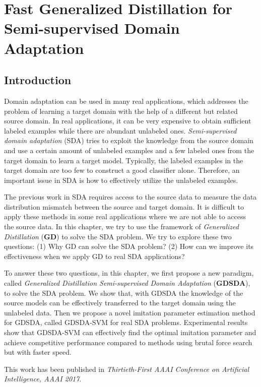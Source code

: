 \chapter{Fast Generalized Distillation for Semi-supervised Domain Adaptation}\label{sec:aaai}
\section{Introduction}
Domain adaptation can be used in many real applications, which addresses the problem of learning a target domain with the help of a different but related source domain. 
In real applications, it can be very expensive to obtain sufficient labeled examples while there are abundant unlabeled ones. 
\textit{Semi-supervised domain adaptation} (SDA) tries to exploit the knowledge from the source domain and use a certain amount of unlabeled examples and a few labeled ones from the target domain to learn a target model. Typically, the labeled examples in the target domain are too few to construct a good classifier alone. Therefore, an important issue in SDA is how to effectively utilize the unlabeled examples.

The previous work in SDA requires access to the source data to measure the data distribution mismatch between the source and target domain\cite{duan2009domain,Donahue_2013_CVPR,daume2010frustratingly,yao2015semi}. It is difficult to apply these methods in some real applications where we are not able to access the source data. In this chapter, we try to use the framework of \textit{Generalized Distillation} (\textbf{GD})\cite{lopez2015unifying} to solve the SDA problem. We try to explore these two questions: (1) Why GD can solve the SDA problem? (2) How can we improve its effectiveness when we apply GD to real SDA applications?

To answer these two questions, in this chapter, we first propose a new paradigm, called \textit{Generalized Distillation Semi-supervised Domain Adaptation} (\textbf{GDSDA}), to solve the SDA problem. We show that, with GDSDA the knowledge of the source models can be effectively transferred to the target domain using the unlabeled data. Then we propose a novel imitation parameter estimation method for GDSDA, called GDSDA-SVM for real SDA problems. Experimental results show that GDSDA-SVM can effectively find the optimal imitation parameter and achieve competitive performance compared to methods using brutal force search but with faster speed. 

This work has been published in \textit{Thirtieth-First AAAI Conference on Artificial Intelligence, AAAI 2017}.

